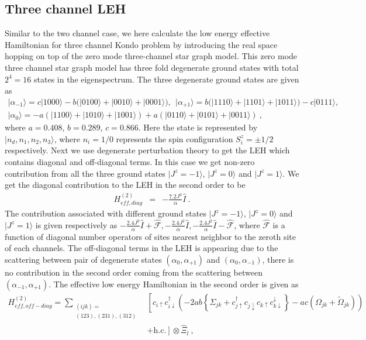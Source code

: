 \documentclass[10pt]{iopart}
\begin{document}
\subsection{Three channel LEH}
Similar to the two channel case, we here calculate the low energy effective Hamiltonian for three channel Kondo problem by introducing the real space hopping on top of the zero mode three-channel star graph model. This zero mode three channel star graph model has three fold degenerate ground states with total $2^4=16$ states in the eigenspectrum. The three degenerate ground states are given as 
\begin{eqnarray}
|\alpha_{-1}\rangle = c|1000 \rangle-b (|0100 \rangle + |0010 \rangle+ | 0001 \rangle), ~ ~ |\alpha_{+1}\rangle = b(|1110 \rangle+ | 1101 \rangle + | 1011 \rangle)-c | 0111 \rangle,\nonumber\\
|\alpha_0\rangle = -a(|1100 \rangle + |1010\rangle +|1001 \rangle) + a(|0110 \rangle+| 0101 \rangle +| 0011\rangle)~,
\end{eqnarray}
where $a=0.408$, $b=0.289$, $c=0.866$. Here the state is represented by $|n_{d},n_1,n_2,n_3\rangle$, where $n_i=1/0$ represents the spin configuration $S_i^z=\pm 1/2$ respectively. Next we use degenerate perturbation theory to get the LEH which contains diagonal and off-diagonal terms. In this case we get non-zero contribution from all the three ground states $|J^z=-1\rangle$, $|J^z=0\rangle$ and $|J^z=1\rangle$. We get the diagonal contribution to the LEH in the second order to be
\begin{eqnarray}
H^{(2)}_{eff, diag} &=& - \frac{7.2 J^2}{\alpha} \hat{I}~.
\end{eqnarray}
The contribution associated with different ground states $|J^z=-1\rangle$, $|J^z=0\rangle$ and $|J^z=1\rangle$ is given respectively as $- \frac{2.4 J^2}{\alpha} \hat{I} + \hat{\mathcal{F}},- \frac{2.4 J^2}{\alpha} \hat{I} ,- \frac{2.4 J^2}{\alpha} \hat{I} - \hat{\mathcal{F} }$,
where $\hat{\mathcal{F}}$ is a function of diagonal number operators of sites nearest neighbor to the zeroth site of each channels. The off-diagonal terms in the LEH is appearing due to the scattering between pair of degenerate states $(\alpha_0,\alpha_{+1})$ and $(\alpha_0,\alpha_{-1})$, there is no contribution in the second order coming from the scattering between $(\alpha_{-1},\alpha_{+1})$. The effective low energy Hamiltonian in the second order is given as
\begin{eqnarray}
	H^{(2)}_{eff,off-diag} = \sum_{\substack{(ijk)=\\(123),(231),(312)}}&\left[ c_{i\uparrow}c_{i\downarrow}^{\dagger} \left( -2ab \left\{ \Sigma_{jk} +c_{j\uparrow}^{\dagger}c_{j\downarrow}c_{k\uparrow}c_{k\downarrow}^{\downarrow} \right\} -ac(\Omega_{jk}+\tilde{\Omega}_{jk}) \right) \right.\nonumber\\
										  &\left. + \textrm{h.c.}\right] \otimes \hat{\Xi}_l~,
\end{eqnarray}
\end{document}
